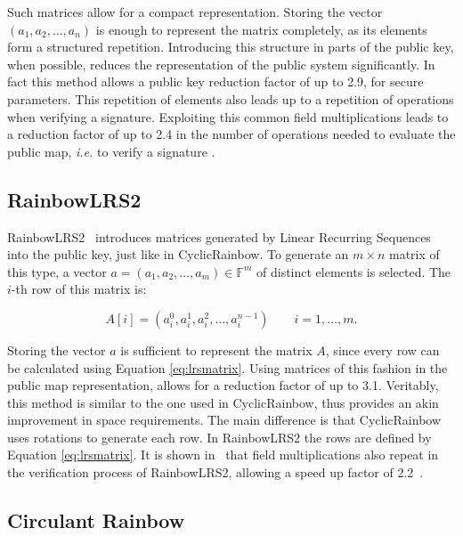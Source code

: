 \documentclass{ufsctex/ufsctex}
\begin{document}
Such matrices allow for a compact representation. Storing the vector $(a_1,
a_2, \dots, a_n)$ is enough to represent the matrix completely, as its elements
form a structured repetition. Introducing this structure in parts of the public
key, when possible, reduces the representation of the public system
significantly. In fact this method allows a public key reduction factor of up
to 2.9, for secure parameters. This repetition of elements also leads up to a
repetition of operations when verifying a signature. Exploiting this common
field multiplications leads to a reduction factor of up to 2.4 in the number of
operations needed to evaluate the public map, \textit{i.e.} to verify a
signature \cite[Table 10.3]{petzoldt2013thesis}.

\subsection{RainbowLRS2}

RainbowLRS2~\cite[Section 9.2]{petzoldt2013thesis} introduces matrices
generated by Linear Recurring Sequences into the public key, just like in
CyclicRainbow. To generate an $m \times n$ matrix of this type, a vector $a =
(a_1, a_2, \dots, a_m) \in \mathbb{F}^m$ of distinct elements is selected.
The $i$-th row of this matrix is:

\begin{equation}\label{eq:lrsmatrix}
A[i] = (a_i^0, a_i^1, a_i^2, \dots, a_i^{n-1}) \qquad i = 1, \dots, m.
\end{equation}

Storing the vector $a$ is sufficient to represent the matrix $A$, since every
row can be calculated using Equation \ref{eq:lrsmatrix}. Using matrices of this
fashion in the public map representation, allows for a reduction factor of up
to 3.1. Veritably, this method is similar to the one used in CyclicRainbow,
thus provides an akin improvement in space requirements. The main difference is
that CyclicRainbow uses rotations to generate each row. In RainbowLRS2 the rows
are defined by Equation \ref{eq:lrsmatrix}. It is shown
in~\cite{petzoldt2013thesis} that field multiplications also repeat in the
verification process of RainbowLRS2, allowing a speed up factor of
2.2~\cite[Table 10.3]{petzoldt2013thesis}.

\subsection{Circulant Rainbow}
\end{document}

